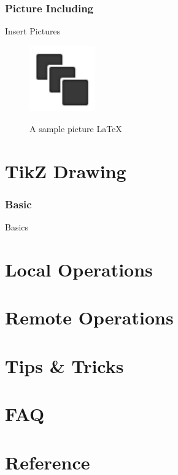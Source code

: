 ﻿\documentclass[xcolor=svgnames]{beamer}
\begin{document}
\section[Picture Including]{Picture Including}
\begin{frame}{Insert Pictures}
\begin{figure}[htbp]
  \centering
  \includegraphics[width=80pt]{sample.png}\\
  \caption{A sample picture \LaTeX}
  \label{fig:sample}
\end{figure}
\end{frame}


\part[TikZ Drawing]{TikZ Drawing}
\section[Basic]{Basic}
\begin{frame}{Basics}
\begin{figure}
  \centering
\end{figure}
\end{frame}


\part[Local Operations]{Local Operations}
\begin{frame}
\end{frame}


\part[Remote Operations]{Remote Operations}
\begin{frame}
\end{frame}


\part[Tips \& Tricks]{Tips \& Tricks}
\begin{frame}
\end{frame}


\part[FAQ]{FAQ}
\begin{frame}
\end{frame}


\part[Reference]{Reference}
\end{document}
